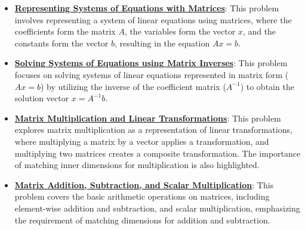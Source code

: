 \documentclass{article}%
\begin{document}
\begin{itemize}[leftmargin=*]%
\item \href{https://purdue.brightspace.com/d2l/common/assets/pdfjs-d2l-dist/1.0.14-legacy/web/viewer.html?file=\%2Fcontent\%2Fenforced\%2F1095467-wl.202510.CS.24300.001\%2F04L1-Linear Algebra Primer.pdf\%3Fou\%3D1095467\&lang=en-us\&container=d2l-fileviewer-rendered-pdf\&fullscreen=d2l-fileviewer-rendered-pdf-dialog\&height=667#page=11}{\textbf{Representing Systems of Equations with Matrices}}: This problem involves representing a system of linear equations using matrices, where the coefficients form the matrix $A$, the variables form the vector $x$, and the constants form the vector $b$, resulting in the equation $Ax = b$.%
\item \href{https://purdue.brightspace.com/d2l/common/assets/pdfjs-d2l-dist/1.0.14-legacy/web/viewer.html?file=\%2Fcontent\%2Fenforced\%2F1095467-wl.202510.CS.24300.001\%2F04L1-Linear Algebra Primer.pdf\%3Fou\%3D1095467\&lang=en-us\&container=d2l-fileviewer-rendered-pdf\&fullscreen=d2l-fileviewer-rendered-pdf-dialog\&height=667#page=12}{\textbf{Solving Systems of Equations using Matrix Inverses}}: This problem focuses on solving systems of linear equations represented in matrix form ($Ax = b$) by utilizing the inverse of the coefficient matrix ($A^{-1}$) to obtain the solution vector $x = A^{-1}b$.%
\item \href{https://purdue.brightspace.com/d2l/common/assets/pdfjs-d2l-dist/1.0.14-legacy/web/viewer.html?file=\%2Fcontent\%2Fenforced\%2F1095467-wl.202510.CS.24300.001\%2F04L1-Linear Algebra Primer.pdf\%3Fou\%3D1095467\&lang=en-us\&container=d2l-fileviewer-rendered-pdf\&fullscreen=d2l-fileviewer-rendered-pdf-dialog\&height=667#page=14}{\textbf{Matrix Multiplication and Linear Transformations}}: This problem explores matrix multiplication as a representation of linear transformations, where multiplying a matrix by a vector applies a transformation, and multiplying two matrices creates a composite transformation. The importance of matching inner dimensions for multiplication is also highlighted.%
\item \href{https://purdue.brightspace.com/d2l/common/assets/pdfjs-d2l-dist/1.0.14-legacy/web/viewer.html?file=\%2Fcontent\%2Fenforced\%2F1095467-wl.202510.CS.24300.001\%2F04L1-Linear Algebra Primer.pdf\%3Fou\%3D1095467\&lang=en-us\&container=d2l-fileviewer-rendered-pdf\&fullscreen=d2l-fileviewer-rendered-pdf-dialog\&height=667#page=9}{\textbf{Matrix Addition, Subtraction, and Scalar Multiplication}}: This problem covers the basic arithmetic operations on matrices, including element{-}wise addition and subtraction, and scalar multiplication, emphasizing the requirement of matching dimensions for addition and subtraction.%

\end{itemize}
\end{document}
